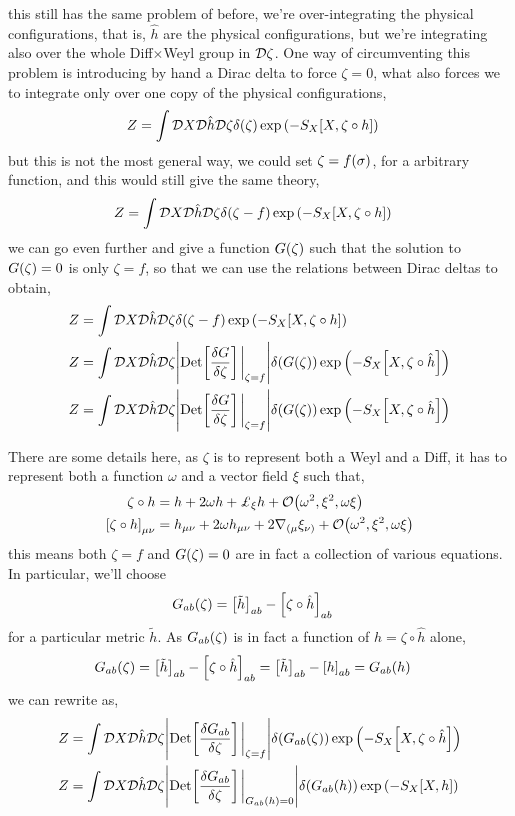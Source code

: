 this still has the same problem of before, we're over-integrating the physical configurations, that is, $\hat h$ are the physical configurations, 
but we're integrating also over the whole Diff$\times$Weyl group in $\mathcal D \zeta$. One way of circumventing this problem is introducing by 
hand a Dirac delta to force $\zeta=0$, what also forces we to integrate only over one copy of the physical configurations,
\begin{align*}
    Z&=\int\mathcal D X\mathcal D \hat h\mathcal D \zeta\delta\qty(\zeta)\exp\qty(-S_X\qty[X,\zeta\circ h])
\end{align*}
but this is not the most general way, we could set $\zeta=f\qty(\sigma)$, for a arbitrary function, and this would still give the same theory,
\begin{align*}
    Z&=\int\mathcal D X\mathcal D \hat h\mathcal D \zeta\delta\qty(\zeta-f)\exp\qty(-S_X\qty[X,\zeta\circ h])
\end{align*}
we can go even further and give a function $G\qty(\zeta)$ such that the solution to $G\qty(\zeta)=0$ is only $\zeta=f$, so that we can use the relations between 
Dirac deltas to obtain,
\begin{align*}
    Z&=\int\Dd{X}\Dd{\hat h}\Dd{\zeta}\delta\qty(\zeta-f)\exp\qty(-S_X\qty[X,\zeta\circ h])\\
    Z&=\int\Dd{X}\Dd{\hat h}\Dd{\zeta}\abs{\Det\qty[\fdv{G}{\zeta}]\eval_{\zeta=f}}\delta\qty(G\qty(\zeta))\exp\qty(-S_X\qty[X,\zeta\circ \hat h])\\
    Z&=\int\Dd{X}\Dd{\hat h}\Dd{\zeta}\abs{\Det\qty[\fdv{G}{\zeta}]\eval_{\zeta=f}}\delta\qty(G\qty(\zeta))\exp\qty(-S_X\qty[X,\zeta\circ \hat h])
\end{align*}

There are some details here, as $\zeta$ is to represent both a Weyl and a Diff, it has to represent both a function $\omega$ and a vector field $\xi$ such 
that,
\begin{align*}
    \zeta \circ h&=h+2\omega h+\pounds_\xi h+\mathcal O\qty(\omega^2,\xi^2,\omega\xi)\\
    \qty[\zeta \circ h]_{\mu\nu}&=h_{\mu\nu}+2\omega h_{\mu\nu}+2\nabla_{(\mu}\xi_{\nu)}+\mathcal O\qty(\omega^2,\xi^2,\omega\xi)
\end{align*}
this means both $\zeta=f$ and $G\qty(\zeta)=0$ are in fact a collection of various equations. In particular, we'll choose
\begin{align*}
    G_{ab}\qty(\zeta)&=\qty[\tilde h]_{ab}-\qty[\zeta\circ \hat h]_{ab}
\end{align*}
for a particular metric $\tilde h$. As $G_{ab}\qty(\zeta)$ is in fact a function of $h=\zeta\circ \hat h$ alone,
\begin{align*}
    G_{ab}\qty(\zeta)&=\qty[\tilde h]_{ab}-\qty[\zeta\circ \hat h]_{ab}=\qty[\tilde h]_{ab}-\qty[h]_{ab}=G_{ab}\qty(h)
\end{align*}
we can rewrite as,
\begin{align*}
    Z&=\int\Dd{X}\Dd{\hat h}\Dd{\zeta}\abs{\Det\qty[\fdv{G_{ab}}{\zeta}]\eval_{\zeta=f}}\delta\qty(G_{ab}\qty(\zeta))\exp\qty(-S_X\qty[X,\zeta\circ \hat h])\\
    Z&=\int\Dd{X}\Dd{\hat h}\Dd{\zeta}\abs{\Det\qty[\fdv{G_{ab}}{\zeta}]\eval_{G_{ab}\qty(h)=0}}\delta\qty(G_{ab}\qty(h))\exp\qty(-S_X\qty[X,h])
\end{align*}
